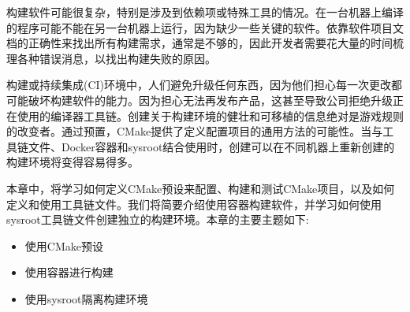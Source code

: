 构建软件可能很复杂，特别是涉及到依赖项或特殊工具的情况。在一台机器上编译的程序可能不能在另一台机器上运行，因为缺少一些关键的软件。依靠软件项目文档的正确性来找出所有构建需求，通常是不够的，因此开发者需要花大量的时间梳理各种错误消息，以找出构建失败的原因。

构建或持续集成(CI)环境中，人们避免升级任何东西，因为他们担心每一次更改都可能破坏构建软件的能力。因为担心无法再发布产品，这甚至导致公司拒绝升级正在使用的编译器工具链。创建关于构建环境的健壮和可移植的信息绝对是游戏规则的改变者。通过预置，CMake提供了定义配置项目的通用方法的可能性。当与工具链文件、Docker容器和sysroot结合使用时，创建可以在不同机器上重新创建的构建环境将变得容易得多。

本章中，将学习如何定义CMake预设来配置、构建和测试CMake项目，以及如何定义和使用工具链文件。我们将简要介绍使用容器构建软件，并学习如何使用sysroot工具链文件创建独立的构建环境。本章的主要主题如下:

\begin{itemize}
\item 
使用CMake预设

\item 
使用容器进行构建

\item 
使用sysroot隔离构建环境
\end{itemize}






































